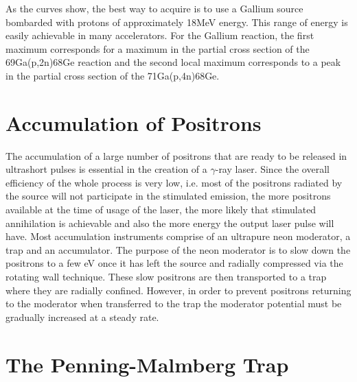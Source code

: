 As the curves show, the best way to acquire is to use a Gallium source bombarded with protons of approximately 18MeV energy. This range of energy is easily achievable in many accelerators. For the Gallium reaction, the first maximum corresponds for a maximum in the partial cross section of the 69Ga(p,2n)68Ge reaction and the second local maximum corresponds to a peak in the partial cross section of the 71Ga(p,4n)68Ge. 

\section{Accumulation of Positrons}

The accumulation of a large number of positrons that are ready to be released in ultrashort pulses is essential in the creation of a $\gamma$-ray laser. Since the overall efficiency of the whole process is very low, i.e. most of the positrons radiated by the source will not participate in the stimulated emission, the more positrons available at the time of usage of the laser, the more likely that stimulated annihilation is achievable and also the more energy the output laser pulse will have. Most accumulation instruments comprise of an ultrapure neon moderator, a trap and an accumulator. The purpose of the neon moderator is to slow down the positrons to a few eV once it has left the source and radially compressed via the rotating wall technique. These slow positrons are then transported to a trap where they are radially confined. However, in order to prevent positrons returning to the moderator when transferred to the trap the moderator potential must be gradually increased at a steady rate.

\section{The Penning-Malmberg Trap}

